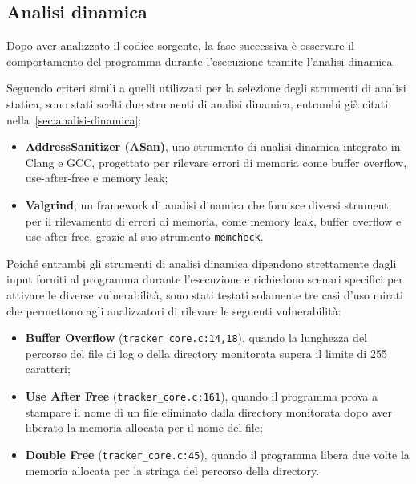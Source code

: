 \subsection*{Analisi dinamica}
Dopo aver analizzato il codice sorgente, la fase successiva è osservare il
comportamento del programma durante l'esecuzione tramite l'analisi dinamica.

Seguendo criteri simili a quelli utilizzati per la selezione degli strumenti di
analisi statica, sono stati scelti due strumenti di analisi dinamica, entrambi
già citati nella~\autoref{sec:analisi-dinamica}:
\begin{itemize}
  \item \textbf{AddressSanitizer (ASan)}, uno strumento di analisi dinamica integrato
    in Clang e GCC, progettato per rilevare errori di memoria come buffer
    overflow, use-after-free e memory leak;

  \item \textbf{Valgrind}, un framework di analisi dinamica che fornisce diversi
    strumenti per il rilevamento di errori di memoria, come memory leak, buffer overflow
    e use-after-free, grazie al suo strumento \texttt{memcheck}.
\end{itemize}

\noindent
Poiché entrambi gli strumenti di analisi dinamica dipendono strettamente dagli
input forniti al programma durante l'esecuzione e richiedono scenari specifici
per attivare le diverse vulnerabilità, sono stati testati solamente tre casi d'uso
mirati che permettono agli analizzatori di rilevare le seguenti vulnerabilità:
\begin{itemize}
  \item \textbf{Buffer Overflow} (\texttt{tracker\_core.c:14,18}), quando la
    lunghezza del percorso del file di log o della directory monitorata supera
    il limite di 255 caratteri;

  \item \textbf{Use After Free} (\texttt{tracker\_core.c:161}), quando il
    programma prova a stampare il nome di un file eliminato dalla directory
    monitorata dopo aver liberato la memoria allocata per il nome del file;

  \item \textbf{Double Free} (\texttt{tracker\_core.c:45}), quando il programma
    libera due volte la memoria allocata per la stringa del percorso della
    directory.
\end{itemize}

